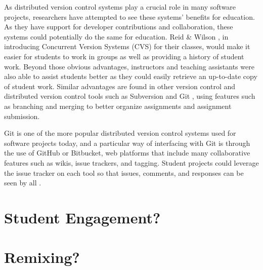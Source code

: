 \begin{itemize}
\begin{itemize}
As distributed version control systems play a crucial role in many software projects, researchers have attempted to see these systems’ benefits for education. As they have support for developer contributions and collaboration, these systems could potentially do the same for education. Reid \& Wilson \cite{reid2005learning}, in introducing Concurrent Version Systems (CVS) for their classes, would make it easier for students to work in groups as well as providing a history of student work. Beyond those obvious advantages, instructors and teaching assistants were also able to assist students better as they could easily retrieve an up-to-date copy of student work. Similar advantages are found in other version control and distributed version control tools such as Subversion \cite{clifton2007subverting} and Git \cite{griffin2013github}, using features such as branching and merging to better organize assignments and assignment submission.

Git is one of the more popular distributed version control systems used for software projects today, and a particular way of interfacing with Git is through the use of GitHub or Bitbucket, web platforms that include many collaborative features such as wikis, issue trackers, and tagging. Student projects could leverage the issue tracker on each tool so that issues, comments, and responses can be seen by all \cite{kelleher2014employing}. %


\section{Student Engagement?}


\section{Remixing?}


\end{itemize}
\end{itemize}
